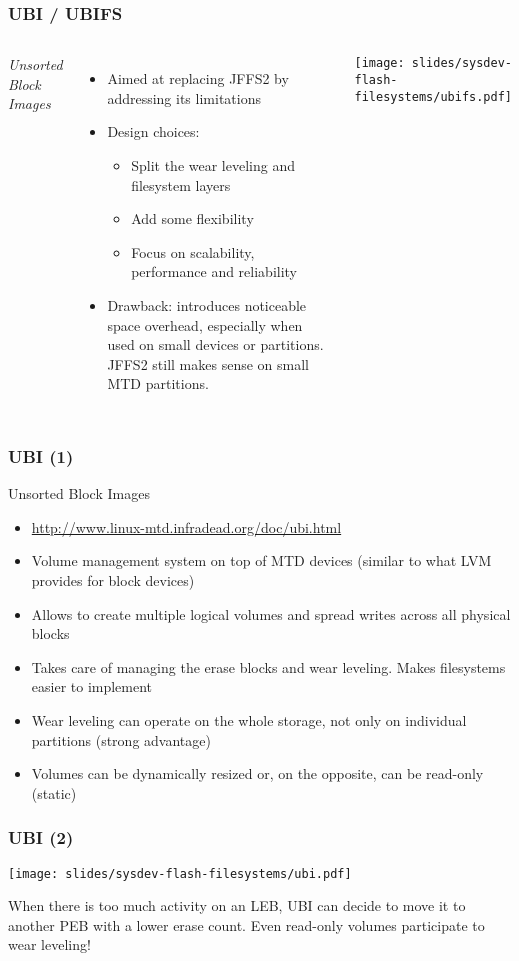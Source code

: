 \begin{frame}
  \frametitle{UBI / UBIFS}
  \begin{columns}
    {\em Unsorted Block Images}
    \begin{itemize}
    \item Aimed at replacing JFFS2 by addressing its limitations
    \item Design choices:
      \begin{itemize}
      \item Split the wear leveling and filesystem layers
      \item Add some flexibility
      \item Focus on scalability, performance and reliability
      \end{itemize}
    \item Drawback: introduces noticeable space overhead,
      especially when used on small devices or partitions. JFFS2
      still makes sense on small MTD partitions.
    \end{itemize}
    \texttt{[image: slides/sysdev-flash-filesystems/ubifs.pdf]}
  \end{columns}
\end{frame}

\begin{frame}
  \frametitle{UBI (1)}
  Unsorted Block Images
  \begin{itemize}
  \item \url{http://www.linux-mtd.infradead.org/doc/ubi.html}
  \item Volume management system on top of MTD devices (similar to
    what LVM provides for block devices)
  \item Allows to create multiple logical volumes and spread writes
    across all physical blocks
  \item Takes care of managing the erase blocks and wear
    leveling. Makes filesystems easier to implement
  \item Wear leveling can operate on the whole storage,
    not only on individual partitions (strong advantage)
  \item Volumes can be dynamically resized or, on the opposite, can be
    read-only (static)
  \end{itemize}
\end{frame}

\begin{frame}
  \frametitle{UBI (2)}
  \begin{center}
    \texttt{[image: slides/sysdev-flash-filesystems/ubi.pdf]}
  \end{center}
  When there is too much activity on an LEB, UBI can decide to move it
  to another PEB with a lower erase count. Even read-only volumes
  participate to wear leveling!
\end{frame}

